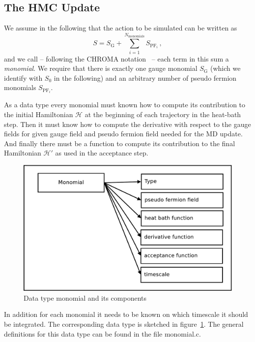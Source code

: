 \subsection{The HMC Update}

We assume in the following that the action to be simulated can be
written as 
\[
S = S_\mathrm{G} + \sum_{i=1}^{N_\mathrm{monomials}} S_{\mathrm{PF}_i}\, ,
\]
and we call -- following the CHROMA notation~\cite{Edwards:2004sx} -- each
term in this sum a \emph{monomial}. We require that there is exactly one
gauge monomial $S_\mathrm{G}$ (which we identify with $S_0$ in the
following) and an arbitrary number of pseudo
fermion monomials $S_{\mathrm{PF}_i}$.

As a data type every monomial must known how to compute its
contribution to the initial Hamiltonian $\mathcal{H}$ at the beginning
of each trajectory in the heat-bath step. Then it must know how to
compute the derivative with respect to the gauge fields for given
gauge field and pseudo fermion field needed for the MD update. And finally
there must be a function to compute its contribution to the final
Hamiltonian $\mathcal{H}'$ as used in the acceptance step.

\begin{figure}[t]
  \centering
  \includegraphics[width=0.7\linewidth]{monomial}
  \caption{Data type monomial and its components}
  \label{fig:monomial}
\end{figure}

In addition for each monomial it needs to be known on which timescale
it should be integrated. The corresponding data type is sketched in
figure~\ref{fig:monomial}. The general definitions for this data type
can be found in the file {\ttfamily monomial.c}. 

